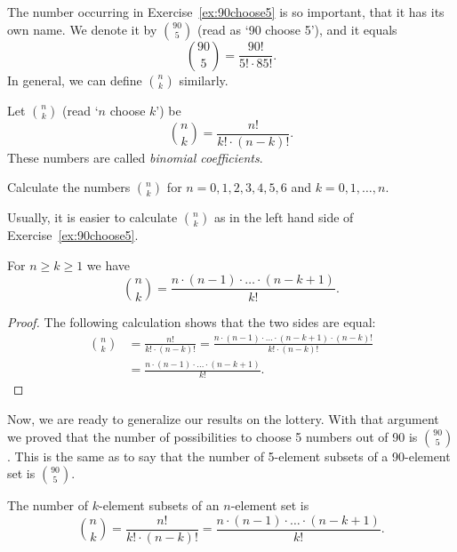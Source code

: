 The number occurring in Exercise~\ref{ex:90choose5} is so important, 
that it has its own name. 
We denote it by $\binom{90}{5}$ (read as `90 choose 5'), 
and it equals
\[
\binom{90}{5} = \frac{90!}{5! \cdot 85!}. 
\]
In general, we can define $\binom{n}{k}$ similarly. 

\begin{definition}
Let $\binom{n}{k}$ (read `$n$ choose $k$') be
\[
\binom{n}{k} = \frac{n!}{k! \cdot (n-k)!}. 
\]
These numbers are called \emph{binomial coefficients}. 
\end{definition}

\begin{exercise}\label{ex:smallnchoosek}
Calculate the numbers $\binom{n}{k}$ for $n = 0, 1, 2, 3, 4, 5, 6$ and $k = 0, 1, \dots, n$. 
\end{exercise}

Usually, 
it is easier to calculate $\binom{n}{k}$ as in the left hand side of Exercise~\ref{ex:90choose5}. 

\begin{proposition}\label{prop:nchoosek}
For $n\geq k\geq 1$ we have 
\[
\binom{n}{k} = \frac{n \cdot (n-1) \cdot \dots \cdot (n-k+1)}{k!}. 
\]
\end{proposition}

\begin{proof}
The following calculation shows that the two sides are equal: %
\begin{align*}
\binom{n}{k} &= \frac{n!}{k! \cdot (n-k)!} = \frac{n \cdot (n-1) \cdot \dots \cdot (n-k+1) \cdot (n-k)!}{k! \cdot (n-k)!} \\
&= \frac{n \cdot (n-1) \cdot \dots \cdot (n-k+1)}{k!}. 
\end{align*}
\end{proof}

Now, we are ready to generalize our results on the lottery. 
With that argument we proved that the number of possibilities to choose 5 numbers out of 90 is $\binom{90}{5}$. 
This is the same as to say that the number of 5-element subsets of a 90-element set is $\binom{90}{5}$. 

\begin{theorem}\label{thm:nchoosek}
The number of $k$-element subsets of an $n$-element set is 
\begin{equation}\label{eq:binom}
\binom{n}{k} = \frac{n!}{k! \cdot (n-k)!} = \frac{n \cdot (n-1) \cdot \dots \cdot (n-k+1)}{k!}.
\end{equation}
\end{theorem}

